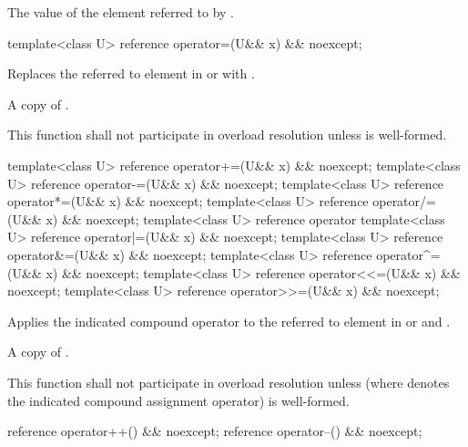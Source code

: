 \begin{itemdescr}
  \pnum\returns
  The value of the element referred to by .
\end{itemdescr}

\begin{itemdecl}
template<class U> reference operator=(U&& x) && noexcept;
\end{itemdecl}

\begin{itemdescr}
  \pnum\effects
  Replaces the referred to element in  or  with .

  \pnum\returns
  A copy of .

  \pnum\remarks
  This function shall not participate in overload resolution unless  is well-formed.
\end{itemdescr}

\begin{itemdecl}
template<class U> reference operator+=(U&& x) && noexcept;
template<class U> reference operator-=(U&& x) && noexcept;
template<class U> reference operator*=(U&& x) && noexcept;
template<class U> reference operator/=(U&& x) && noexcept;
template<class U> reference operator%
template<class U> reference operator|=(U&& x) && noexcept;
template<class U> reference operator&=(U&& x) && noexcept;
template<class U> reference operator^=(U&& x) && noexcept;
template<class U> reference operator<<=(U&& x) && noexcept;
template<class U> reference operator>>=(U&& x) && noexcept;
\end{itemdecl}

\begin{itemdescr}
  \pnum\effects
  Applies the indicated compound operator to the referred to element in  or  and .

  \pnum\returns
  A copy of .

  \pnum\remarks
  This function shall not participate in overload resolution unless  (where  denotes the indicated compound assignment operator) is well-formed.
\end{itemdescr}

\begin{itemdecl}
reference operator++() && noexcept;
reference operator--() && noexcept;
\end{itemdecl}

